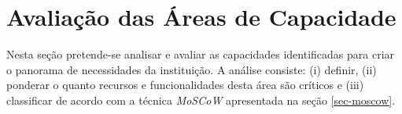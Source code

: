 \section{Avaliação das Áreas de Capacidade}
\label{sec-avaliacao}

Nesta seção pretende-se analisar e avaliar as capacidades identificadas para criar o panorama de necessidades da instituição. A análise consiste: (i) definir, (ii) ponderar o quanto recursos e funcionalidades desta área são críticos e (iii) classificar de acordo com a técnica \emph{MoSCoW} apresentada na seção \ref{sec-moscow}. 


































